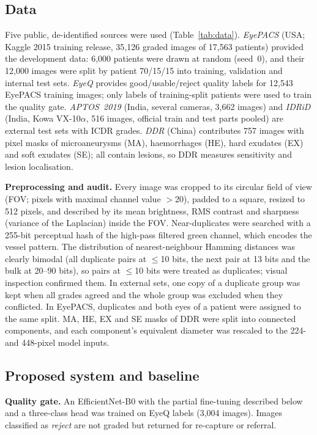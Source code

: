\documentclass[11pt,a4paper]{article}
\begin{document}
\subsection{Data}
Five public, de-identified sources were used (Table~\ref{tab:data}). \emph{EyePACS} \cite{cuadros2009} (USA; Kaggle 2015 training release, 35{,}126 graded images of 17{,}563 patients) provided the development data: 6{,}000 patients were drawn at random (seed~0), and their 12{,}000 images were split by patient 70/15/15 into training, validation and internal test sets. \emph{EyeQ} \cite{fu2019} provides good/usable/reject quality labels for 12{,}543 EyePACS training images; only labels of training-split patients were used to train the quality gate. \emph{APTOS~2019} \cite{aptos2019} (India, several cameras, 3{,}662 images) and \emph{IDRiD} \cite{porwal2018} (India, Kowa VX-10$\alpha$, 516 images, official train and test parts pooled) are external test sets with ICDR grades. \emph{DDR} \cite{li2019} (China) contributes 757 images with pixel masks of microaneurysms (MA), haemorrhages (HE), hard exudates (EX) and soft exudates (SE); all contain lesions, so DDR measures sensitivity and lesion localisation.

\textbf{Preprocessing and audit.} Every image was cropped to its circular field of view (FOV; pixels with maximal channel value $>$20), padded to a square, resized to 512 pixels, and described by its mean brightness, RMS contrast and sharpness (variance of the Laplacian) inside the FOV. Near-duplicates were searched with a 255-bit perceptual hash of the high-pass filtered green channel, which encodes the vessel pattern. The distribution of nearest-neighbour Hamming distances was clearly bimodal (all duplicate pairs at $\leq$10 bits, the next pair at 13 bits and the bulk at 20--90 bits), so pairs at $\leq$10 bits were treated as duplicates; visual inspection confirmed them. In external sets, one copy of a duplicate group was kept when all grades agreed and the whole group was excluded when they conflicted. In EyePACS, duplicates and both eyes of a patient were assigned to the same split. MA, HE, EX and SE masks of DDR were split into connected components, and each component's equivalent diameter was rescaled to the 224- and 448-pixel model inputs.

\subsection{Proposed system and baseline}
\textbf{Quality gate.} An EfficientNet-B0 with the partial fine-tuning described below and a three-class head was trained on EyeQ labels (3{,}004 images). Images classified as \emph{reject} are not graded but returned for re-capture or referral.
\end{document}
